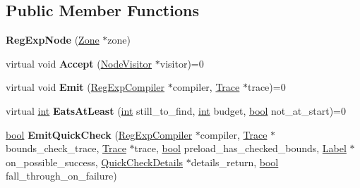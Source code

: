 \subsection*{Public Member Functions}
\begin{DoxyCompactItemize}
\item 
\mbox{\label{classv8_1_1internal_1_1RegExpNode_add9600e01845a3ef14f42ab18177ca3c}} 
{\bfseries Reg\+Exp\+Node} (\mbox{\hyperlink{classv8_1_1internal_1_1Zone}{Zone}} $\ast$zone)
\item 
\mbox{\label{classv8_1_1internal_1_1RegExpNode_ac6b89282f32103ee66d71780f738350b}} 
virtual void {\bfseries Accept} (\mbox{\hyperlink{classv8_1_1internal_1_1NodeVisitor}{Node\+Visitor}} $\ast$visitor)=0
\item 
\mbox{\label{classv8_1_1internal_1_1RegExpNode_ab9cd401dec1ad113895eab29871317c6}} 
virtual void {\bfseries Emit} (\mbox{\hyperlink{classv8_1_1internal_1_1RegExpCompiler}{Reg\+Exp\+Compiler}} $\ast$compiler, \mbox{\hyperlink{classv8_1_1internal_1_1Trace}{Trace}} $\ast$trace)=0
\item 
\mbox{\label{classv8_1_1internal_1_1RegExpNode_aea14efd681709d8fd872361f05c4abf8}} 
virtual \mbox{\hyperlink{classint}{int}} {\bfseries Eats\+At\+Least} (\mbox{\hyperlink{classint}{int}} still\+\_\+to\+\_\+find, \mbox{\hyperlink{classint}{int}} budget, \mbox{\hyperlink{classbool}{bool}} not\+\_\+at\+\_\+start)=0
\item 
\mbox{\label{classv8_1_1internal_1_1RegExpNode_a9926645d60a5ce538c4c79f8e7151ca2}} 
\mbox{\hyperlink{classbool}{bool}} {\bfseries Emit\+Quick\+Check} (\mbox{\hyperlink{classv8_1_1internal_1_1RegExpCompiler}{Reg\+Exp\+Compiler}} $\ast$compiler, \mbox{\hyperlink{classv8_1_1internal_1_1Trace}{Trace}} $\ast$bounds\+\_\+check\+\_\+trace, \mbox{\hyperlink{classv8_1_1internal_1_1Trace}{Trace}} $\ast$trace, \mbox{\hyperlink{classbool}{bool}} preload\+\_\+has\+\_\+checked\+\_\+bounds, \mbox{\hyperlink{classv8_1_1internal_1_1Label}{Label}} $\ast$on\+\_\+possible\+\_\+success, \mbox{\hyperlink{classv8_1_1internal_1_1QuickCheckDetails}{Quick\+Check\+Details}} $\ast$details\+\_\+return, \mbox{\hyperlink{classbool}{bool}} fall\+\_\+through\+\_\+on\+\_\+failure)

\end{DoxyCompactItemize}

